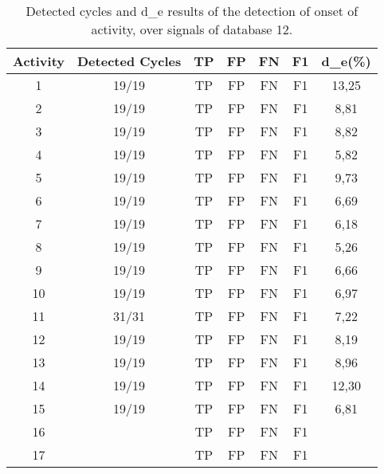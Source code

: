 \begin{table}[ht]
\caption{Detected cycles and \gls{d_e} results of the detection of onset of activity, over signals of database 12.}
\centering
\begin{tabular}{ccccccc}
\toprule
Activity & Detected Cycles & TP & FP & FN & F1 & \gls{d_e}(\%) \\ \midrule
1         & 19/19 & TP & FP & FN & F1 & 13,25                                                                                   \\
2         & 19/19 & TP & FP & FN & F1 & 8,81                                                                                    \\
3         & 19/19 & TP & FP & FN & F1 & 8,82                                                                                    \\
4         & 19/19 & TP & FP & FN & F1 & 5,82                                                                                    \\
5         & 19/19 & TP & FP & FN & F1 & 9,73                                                                                    \\
6         & 19/19 & TP & FP & FN & F1 & 6,69                                                                                    \\
7         & 19/19 & TP & FP & FN & F1 & 6,18                                                                                    \\
8         & 19/19 & TP & FP & FN & F1 & 5,26                                                                                    \\
9         & 19/19 & TP & FP & FN & F1 & 6,66                                                                                    \\
10        & 19/19 & TP & FP & FN & F1 & 6,97                                                                                    \\
11        & 31/31 & TP & FP & FN & F1 & 7,22                                                                                    \\
12        & 19/19& TP & FP & FN & F1 & 8,19                                                                                    \\
13        & 19/19& TP & FP & FN & F1 &8,96                                                                                    \\
14        & 19/19 & TP & FP & FN & F1 & 12,30                                                                                   \\
15        & 19/19 & TP & FP & FN & F1 & 6,81                    
\\
16		& & TP & FP & FN & F1 & \\
17		& & TP & FP & FN & F1 & \\
\bottomrule
\end{tabular}
\label{tab:sf_results}
\end{table}


